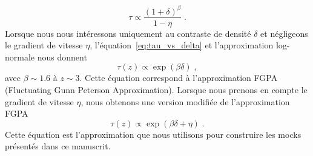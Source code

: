\begin{equation}
  \label{eq:tau_vs_delta}
  \tau \propto \frac{(1+\delta)^{\beta}}{1 - \eta} \; .
\end{equation}
Lorsque nous nous intéressons uniquement au contraste de densité $\delta$ et négligeons le gradient de vitesse $\eta$, l'équation~\ref{eq:tau_vs_delta} et l'approximation log-normale \autocite{coles_lognormal_1991, Bi1996} nous donnent 
\begin{equation}
\tau(z) \propto \exp(\beta \delta) \; ,
\end{equation}
avec $\beta \sim \num{1.6}$ à $z \sim 3$.
Cette équation correspond à l'approximation FGPA (Fluctuating Gunn Peterson Approximation).
Lorsque nous prenons en compte le gradient de vitesse $\eta$, nous obtenons une version modifiée de l'approximation FGPA
\begin{equation}
\tau(z) \propto \exp(\beta \delta + \eta) \; .
\end{equation}
Cette équation est l'approximation que nous utilisons pour construire les mocks présentés dans ce manuscrit.




% 
